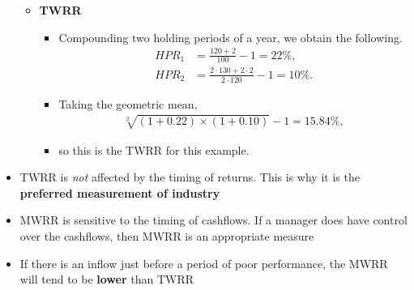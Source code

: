 \documentclass[../notes_compiled.tex]{subfiles}
\begin{document}
\begin{itemize}
{\begin{itemize}
\item[] \textbf{TWRR}
\begin{itemize}
\item[] Compounding two holding periods of a year, we obtain the following.
\begin{align*}
HPR_{1}&=\frac{120+2}{100}-1 = 22\%, \\
HPR_{2}&=\frac{2\cdot130 + 2\cdot2}{2\cdot120}-1 = 10\%.
\end{align*}
\item[] Taking the geometric mean,
\begin{align*}
\sqrt[2]{(1+0.22) \times (1+0.10)} -1 = 15.84\%,
\end{align*}
\item[] so this is the TWRR for this example.
\end{itemize}
\end{itemize}
}
\item TWRR is \emph{not} affected by the timing of returns.  This is why it is the \textbf{preferred measurement of industry}
\item MWRR is sensitive to the timing of cashflows. If a manager does have control over the cashflows, then MWRR is an appropriate measure

\item If there is an inflow just before a period of poor performance, the MWRR will tend to be \textbf{lower} than TWRR
\end{itemize}
\end{document}
